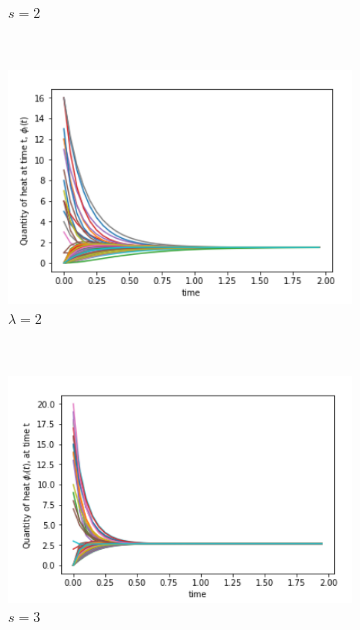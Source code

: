 \documentclass[10pt,a4paper]{article}
\theoremstyle{plain}
\theoremstyle{definition}
\begin{document}
\begin{figure}[H]
\begin{subfigure}[b]{0.45\textwidth}
        		\caption{$s=2$}
        	\end{subfigure}~
        	\begin{subfigure}[b]{0.45\textwidth}
        		\includegraphics[width= \textwidth]{images/Barabasi-Laplace2.png}
        		\caption{$\lambda=2$}
        	\end{subfigure}\\
        	\begin{subfigure}[b]{0.45\textwidth}
        		\includegraphics[width= \textwidth]{images/Barabasi-Mellin3.png}
        		\caption{$s=3$}
        	\end{subfigure}~
        	\begin{subfigure}[b]{0.45\textwidth}

\end{subfigure}
\end{figure}
\end{document}
